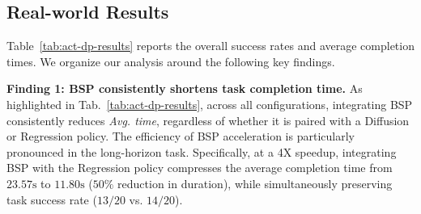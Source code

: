 










\subsection{Real-world Results}
\vspace{-5pt}

Table~\ref{tab:act-dp-results} reports the overall success rates and average completion times. We organize our analysis around the following key findings.
\vspace{-5pt}

\textbf{Finding 1: BSP consistently shortens task completion time.} As highlighted in Tab.~\ref{tab:act-dp-results}, across all configurations, integrating BSP consistently reduces \textit{Avg. time}, regardless of whether it is paired with a Diffusion or Regression policy.
%
The efficiency of BSP acceleration is particularly pronounced in the long-horizon \cleantable task. Specifically, at a 4X speedup, integrating BSP with the Regression policy compresses the average completion time from $23.57\text{s}$ to $11.80\text{s}$ ($50\%$ reduction in duration), while simultaneously preserving task success rate ($13/20$ vs. $14/20$).



